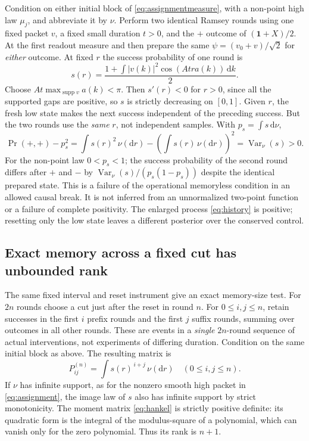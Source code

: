 \documentclass[11pt]{article}
\newcommand{\dd}{\mathrm d}
\newcommand{\one}{\mathbf 1}
\newcommand{\vac}{v_0}
\begin{document}
Condition on either initial block of \eqref{eq:assignmentmeasure}, with a non-point high law \(\mu_j\), and abbreviate it by \(\nu\). Perform two identical Ramsey rounds using one fixed packet \(v\), a fixed small duration \(t>0\), and the \(+\) outcome of \((\one+X)/2\). At the first readout measure and then prepare the same \(\psi=(\vac+v)/\sqrt2\) for \emph{either} outcome. At fixed \(r\) the success probability of one round is
\begin{equation}
 s(r)=\frac{1+\int |v(k)|^2\cos(At r a(k))\,\dd k}{2}.
 \label{eq:success}
\end{equation}
Choose \(At\max_{\operatorname{supp} v}a(k)<\pi\). Then \(s'(r)<0\) for \(r>0\), since all the supported gaps are positive, so \(s\) is strictly decreasing on \([0,1]\). Given \(r\), the fresh low state makes the next success independent of the preceding success. But the two rounds use the \emph{same} \(r\), not independent samples. With \(p_s=\int s\,\dd\nu\),
\begin{equation}
 \Pr(+,+)-p_s^2
   =\int s(r)^2\,\nu(\dd r)
          -\left(\int s(r)\,\nu(\dd r)\right)^2
   =\operatorname{Var}_{\nu}(s)>0.
 \label{eq:excess}
\end{equation}
For the non-point law \(0<p_s<1\); the success probability of the second round differs after \(+\) and \(-\) by \(\operatorname{Var}_\nu(s)/(p_s(1-p_s))\) despite the identical prepared state. This is a failure of the operational memoryless condition \cite{PollockMarkov} in an allowed causal break. It is not inferred from an unnormalized two-point function or a failure of complete positivity. The enlarged process \eqref{eq:history} is positive; resetting only the low state leaves a different posterior over the conserved control.

\subsection{Exact memory across a fixed cut has unbounded rank}

The same fixed interval and reset instrument give an exact memory-size test. For \(2n\) rounds choose a cut just after the reset in round \(n\). For \(0\leq i,j\leq n\), retain successes in the first \(i\) prefix rounds and the first \(j\) suffix rounds, summing over outcomes in all other rounds. These are events in a \emph{single} \(2n\)-round sequence of actual interventions, not experiments of differing duration. Condition on the same initial block as above. The resulting matrix is
\begin{equation}
 P^{(n)}_{ij}=\int s(r)^{\,i+j}\,\nu(\dd r)
 \quad(0\leq i,j\leq n).
 \label{eq:hankel}
\end{equation}
If \(\nu\) has infinite support, as for the nonzero smooth high packet in \eqref{eq:assignment}, the image law of \(s\) also has infinite support by strict monotonicity. The moment matrix \eqref{eq:hankel} is strictly positive definite: its quadratic form is the integral of the modulus-square of a polynomial, which can vanish only for the zero polynomial. Thus its rank is \(n+1\).
\end{document}
